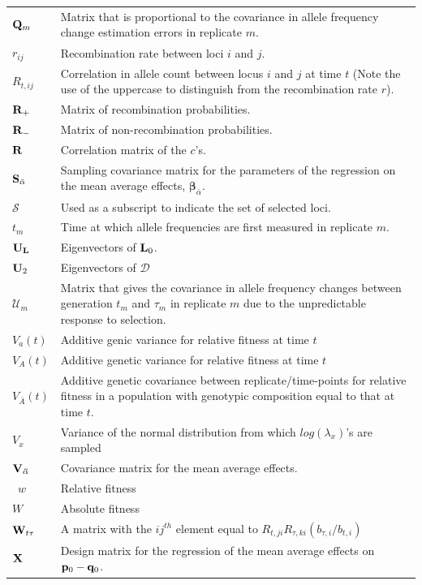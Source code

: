 \documentclass[12pt]{article}
\begin{document}
\begin{longtable}{|p{2cm}|p{13cm}|}
${\bf Q}_m$& Matrix that is proportional to the covariance in allele frequency change estimation errors in replicate $m$.\\
$r_{ij}$&Recombination rate between loci $i$ and $j$.\\
$R_{t,ij}$&Correlation in allele count between locus $i$ and $j$ at time $t$ (Note the use of the uppercase to distinguish from the recombination rate $r$).\\
${\bf R}_{+}$&Matrix of recombination probabilities.\\
${\bf R}_{-}$&Matrix of non-recombination probabilities.\\
${\bf R}$&Correlation matrix of the $c$'s.\\
${\bf S}_{\bar{\alpha}}$&Sampling covariance matrix for the parameters of the regression on the mean average effects, $\boldsymbol{\beta}_{\bar{\alpha}}$.\ \\
$\mathcal{S}$&Used as a subscript to indicate the set of selected loci.\\
$t_m$&Time at which allele frequencies are first measured in replicate $m$.\\
${\bf U}_{\bf L}$&Eigenvectors of ${\bf L}_0$.\\
${\bf U}_{2}$&Eigenvectors of $\boldsymbol{\mathcal{D}}$\\
$\boldsymbol{\mathcal{U}}_m$&Matrix that gives the covariance in allele frequency changes between generation $t_m$ and $\tau_m$ in replicate $m$ due to the unpredictable response to selection.\\
$V_a(t)$&Additive genic variance for relative fitness at time $t$\\
$V_A(t)$&Additive genetic variance for relative fitness at time $t$\\
$V_{\bar A}(t)$&Additive genetic covariance between replicate/time-points for relative fitness in a population with genotypic composition equal to that at time $t$.\\
$V_x$&Variance of the normal distribution from which $log(\lambda_{x})$'s are sampled\\
$\bf{V}_{\bar{\alpha}}$&Covariance matrix for the mean average effects.\\\
$w$&Relative fitness\\
$W$&Absolute fitness\\
${\bf W}_{t\tau}$&A matrix with the $ij^{th}$ element equal to $R_{t,ji}R_{\tau,ki}(b_{\tau,i}/b_{t,i})$\\
${\bf X}$&Design matrix for the regression of the mean average effects on ${\bf p}_0 - {\bf q}_0$.\\

\end{longtable}
\end{document}
